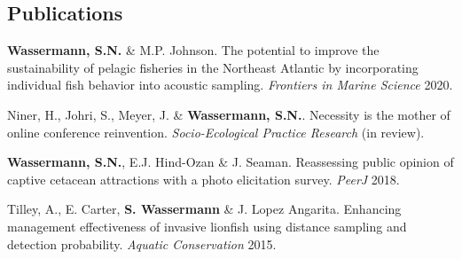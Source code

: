 \documentclass[a4paper]{deedy-resume} %
\begin{document}
\begin{flushleft}
\sectionspace 
\sectionspace



\section{Publications} 

\begin{tightitemize}
\item \textbf{Wassermann, S.N.} \& M.P. Johnson. The potential to improve the sustainability of pelagic fisheries in the Northeast Atlantic by incorporating individual fish behavior into acoustic sampling. \textit{Frontiers in Marine Science} 2020. 
\item Niner, H., Johri, S., Meyer, J. \& \textbf{Wassermann, S.N.}. Necessity is the mother of online conference reinvention. \textit{Socio-Ecological  Practice Research} (in review).
\item \textbf{Wassermann, S.N.}, E.J. Hind-Ozan \& J. Seaman. 
Reassessing public opinion of captive cetacean attractions with a photo elicitation survey. \textit{PeerJ} 2018.
\item Tilley, A., E. Carter, \textbf{S. Wassermann} \& J. Lopez Angarita. Enhancing management effectiveness of invasive lionfish using distance sampling and detection probability. \textit{Aquatic Conservation} 2015.
\end{tightitemize}

\sectionspace


\end{flushleft}
\end{document}
